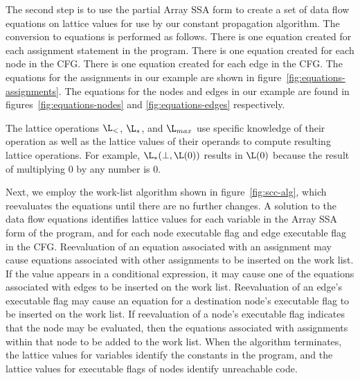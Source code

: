The second step is to use the partial Array SSA form to create a set of
data flow equations on lattice values for use by our constant
propagation algorithm.
The conversion to equations is performed as follows.
There is one equation created for each assignment statement in the program.
There is one equation created for each node in the CFG.
There is one equation created for each edge in the CFG.
The equations for the assignments in our example are shown in
figure~\ref{fig:equations-assignments}. 
The equations for the nodes and edges in our example are found in
figures~\ref{fig:equations-nodes} and \ref{fig:equations-edges} respectively.


The lattice operations $\L_{<}$, $\L_{*}$, and
$\L_{max}$ use specific knowledge of their operation as well as the
lattice values of their operands to compute resulting lattice
operations. For example, $\L_{*}(\bot,\L(0))$ results in $\L(0)$
because the result of multiplying 0 by any number is 0.  




Next, we employ the work-list algorithm shown in figure~\ref{fig:scc-alg}, 
which reevaluates the equations until there are no further
changes.  A solution to the data flow equations identifies
lattice values for each variable in the Array SSA form of the program, and for each node executable flag and
edge executable flag in the CFG.
Reevaluation of an equation associated with an
assignment may cause equations associated with other assignments to be
inserted on the work list. If the value appears in a conditional
expression, it may cause one of the equations associated with edges to
be inserted on the work list. Reevaluation of an edge's executable
flag may cause an equation
for a destination node's executable flag to
be inserted on the work list. If reevaluation of a node's executable flag indicates that
the node may be evaluated, then the equations associated with
assignments within that node to be added to the work list.
When the algorithm terminates, the lattice values for variables identify
the constants in the program, and  the lattice values for executable
flags of nodes identify
unreachable code.


